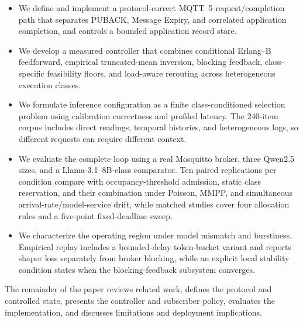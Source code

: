 \begin{itemize}
  \item We define and implement a protocol-correct MQTT~5 request/completion path that separates PUBACK, Message Expiry, and correlated application completion, and controls a bounded application record store.
  \item We develop a measured controller that combines conditional Erlang--B feedforward, empirical truncated-mean inversion, blocking feedback, class-specific feasibility floors, and load-aware rerouting across heterogeneous execution classes.
  \item We formulate inference configuration as a finite class-conditioned selection problem using calibration correctness and profiled latency. The 240-item corpus includes direct readings, temporal histories, and heterogeneous logs, so different requests can require different context.
  \item We evaluate the complete loop using a real Mosquitto broker, three Qwen2.5 sizes, and a Llama-3.1--8B-class comparator. Ten paired replications per condition compare \method{} with occupancy-threshold admission, static class reservation, and their combination under Poisson, MMPP, and simultaneous arrival-rate/model-service drift, while matched studies cover four allocation rules and a five-point fixed-deadline sweep.
  \item We characterize the operating region under model mismatch and burstiness. Empirical replay includes a bounded-delay token-bucket variant and reports shaper loss separately from broker blocking, while an explicit local stability condition states when the blocking-feedback subsystem converges.
\end{itemize}

The remainder of the paper reviews related work, defines the protocol and controlled state, presents the controller and subscriber policy, evaluates the implementation, and discusses limitations and deployment implications.
